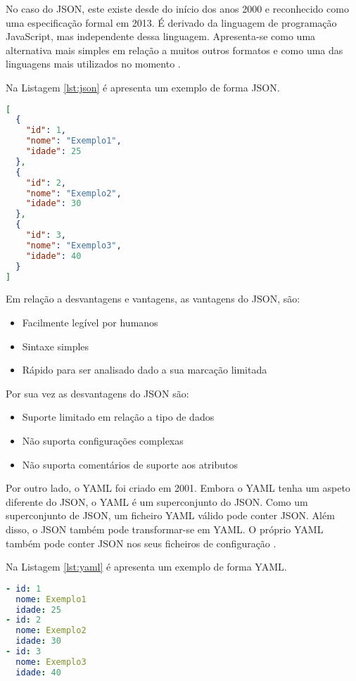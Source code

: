 No caso do JSON, este existe desde do início dos anos 2000 e reconhecido como uma especificação formal em 2013. É derivado da linguagem de programação JavaScript, mas independente dessa linguagem. Apresenta-se como uma alternativa mais simples em relação a muitos outros formatos e como uma das linguagens mais utilizados no momento \cite{formatosDeDados}. 

Na Listagem \ref{lst:json} é apresenta um exemplo de forma JSON.

\begin{minipage}{0.9\linewidth}
\begin{lstlisting}[language=json, caption=Exemplo do formato JSON., label=lst:json]
[
  {
    "id": 1,
    "nome": "Exemplo1",
    "idade": 25
  },
  {
    "id": 2,
    "nome": "Exemplo2",
    "idade": 30
  },
  {
    "id": 3,
    "nome": "Exemplo3",
    "idade": 40
  }
]
\end{lstlisting}
\end{minipage}

Em relação a desvantagens e vantagens, as vantagens do JSON, são:
\begin{itemize}
    \item Facilmente legível por humanos
    \item Sintaxe simples 
    \item Rápido para ser analisado dado a sua marcação limitada \cite{formatosDeDados}
\end{itemize}

Por sua vez as desvantagens do JSON são:
\begin{itemize}
    \item Suporte limitado em relação a tipo de dados
    \item Não suporta configurações complexas
    \item Não suporta comentários de suporte aos atributos \cite{formatosDeDados}
\end{itemize}

Por outro lado, o YAML foi criado em 2001. Embora o YAML tenha um aspeto diferente do JSON, o YAML é um superconjunto do JSON. Como um superconjunto de JSON, um ficheiro YAML válido pode conter JSON. Além disso, o JSON também pode transformar-se em YAML. O próprio YAML também pode conter JSON nos seus ficheiros de configuração \cite{formatosDeDados}.

Na Listagem \ref{lst:yaml} é apresenta um exemplo de forma YAML.

\begin{minipage}{0.9\linewidth}
\begin{lstlisting}[language=yaml, caption=Exemplo do formato YAML. , label=lst:yaml]
- id: 1
  nome: Exemplo1
  idade: 25
- id: 2
  nome: Exemplo2
  idade: 30
- id: 3
  nome: Exemplo3
  idade: 40
\end{lstlisting}
\end{minipage}



